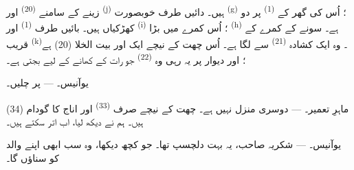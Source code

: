 زینے کے سامنے  \textsuperscript{(20)} اور
 \textsuperscript{(j)} ہیں۔ دائیں طرف
خوبصورت  \textsuperscript{(g)} ؛ اُس کی گھر کے
 \textsuperscript{(1)} پر دو کھڑکیاں ہیں۔ بائیں طرف
 \textsuperscript{(1)} اور 
\textsuperscript{(i)} ؛ اُس کمرے میں بڑا 
\textsuperscript{(h)} ہے۔ سونے کے کمرے کے قریب 
\textsuperscript{(k)}۔ وہ ایک کشادہ  \textsuperscript{(21)}
سے لگا ہے۔ اُس چھت کے نیچے ایک اور بیت الخلا (20) ہے ؛ اور دیوار پر
یہ رہی وہ  \textsuperscript{(22)} جو رات کے کھانے کے لیے
بجتی ہے۔

\textsc{یوآنیس}۔ ---  پر چلیں۔

\textsc{ماہرِ تعمیر}۔ --- دوسری منزل نہیں ہے۔ چھت کے نیچے صرف
 \textsuperscript{(33)} اور اناج کا گودام (34)
ہیں۔ ہم نے دیکھ لیا، اب اتر سکتے ہیں۔

\textsc{یوآنیس}۔ --- شکریہ صاحب، یہ بہت دلچسپ تھا۔ جو کچھ دیکھا، وہ
سب ابھی اپنے والد کو سناؤں گا۔

\VUsaut{4.0mm}
\VUfilet{22mm}
